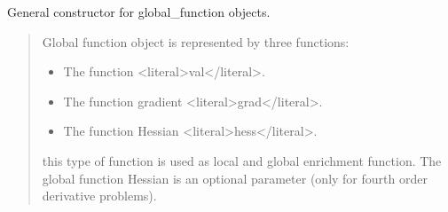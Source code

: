 \documentclass[a4paper,11pt,english]{sphinxmanual}
\begin{document}
\begin{sphinxVerbatim}[commandchars=\\\{\}]
          
    
    \PYG{p}{[}  \PYG{p}{[}  \PYG{p}{]}\PYG{p}{]}
      
      
\end{sphinxVerbatim}

\sphinxAtStartPar
{}

\sphinxAtStartPar
General constructor for global\_function objects.
\begin{quote}

\sphinxAtStartPar
Global function object is represented by three functions:
\begin{itemize}
\item {} 
\sphinxAtStartPar
The function \textless{}literal\textgreater{}val\textless{}/literal\textgreater{}.

\item {} 
\sphinxAtStartPar
The function gradient \textless{}literal\textgreater{}grad\textless{}/literal\textgreater{}.

\item {} 
\sphinxAtStartPar
The function Hessian \textless{}literal\textgreater{}hess\textless{}/literal\textgreater{}.

\end{itemize}

\sphinxAtStartPar
this type of function is used as local and global enrichment function. The
global function Hessian is an optional parameter (only for fourth order
derivative problems).
\end{quote}
\end{document}
